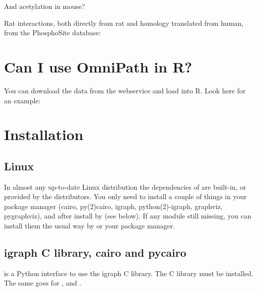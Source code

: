 \documentclass[letterpaper,10pt,english]{sphinxmanual}
\begin{document}
And acetylation in mouse?
\begin{quote}

\end{quote}

Rat interactions, both directly from rat and homology translated from human,
from the PhosphoSite database:
\begin{quote}

\end{quote}


\chapter{Can I use OmniPath in R?}
\label{\detokenize{index:can-i-use-omnipath-in-r}}
You can download the data from the webservice and load into R. Look here for
an example:
\begin{quote}

\end{quote}


\chapter{Installation}
\label{\detokenize{index:installation}}

\section{Linux}
\label{\detokenize{index:linux}}
In almost any up-to-date Linux distribution the dependencies of  are
built-in, or provided by the distributors. You only need to install a couple
of things in your package manager (cairo, py(2)cairo, igraph,
python(2)-igraph, graphviz, pygraphviz), and after install  by 
(see below). If any module still missing, you can install them the usual way
by  or your package manager.


\section{igraph C library, cairo and pycairo}
\label{\detokenize{index:igraph-c-library-cairo-and-pycairo}}
 is a Python interface to use the igraph C library. The
C library must be installed. The same goes for ,  and
.
\end{document}
